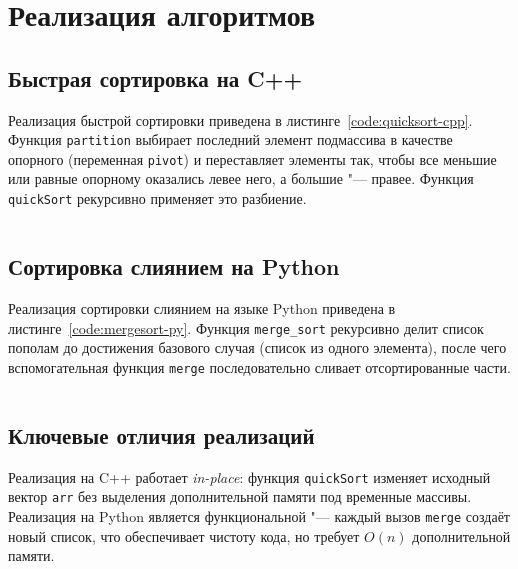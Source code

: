 \section{Реализация алгоритмов}

\subsection{Быстрая сортировка на C++}

Реализация быстрой сортировки приведена в листинге~\ref{code:quicksort-cpp}.
Функция \texttt{partition} выбирает последний элемент подмассива в качестве опорного
(переменная \texttt{pivot}) и переставляет элементы так, чтобы все меньшие или равные
опорному оказались левее него, а большие "--- правее.
Функция \texttt{quickSort} рекурсивно применяет это разбиение.

\begin{listing}[H]
    \inputminted{cpp}{src/quicksort.cpp}
    \caption{Быстрая сортировка на языке C++}
    \label{code:quicksort-cpp}
\end{listing}

\subsection{Сортировка слиянием на Python}

Реализация сортировки слиянием на языке Python приведена в листинге~\ref{code:mergesort-py}.
Функция \texttt{merge_sort} рекурсивно делит список пополам до достижения
базового случая (список из одного элемента), после чего вспомогательная функция
\texttt{merge} последовательно сливает отсортированные части.

\begin{listing}[H]
    \inputminted{python}{src/mergesort.py}
    \caption{Сортировка слиянием на языке Python}
    \label{code:mergesort-py}
\end{listing}

\subsection{Ключевые отличия реализаций}

Реализация на C++ работает \textit{in-place}: функция \texttt{quickSort} изменяет
исходный вектор \texttt{arr} без выделения дополнительной памяти под временные массивы.
Реализация на Python является функциональной "--- каждый вызов \texttt{merge}
создаёт новый список, что обеспечивает чистоту кода, но требует $O(n)$ дополнительной памяти.
